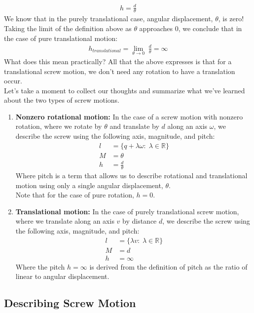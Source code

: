 \documentclass[oneside]{book}
\begin{document}
\begin{align}
    h = \frac{d}{\theta}
\end{align}
We know that in the purely translational case, angular displacement, $\theta$, is zero! Taking the limit of the definition above as $\theta$ approaches $0$, we conclude that in the case of pure translational motion:
\begin{align}
    h_{translational} = \lim_{\theta \to 0} \; \frac{d}{\theta} = \infty
\end{align}
What does this mean practically? All that the above expresses is that for a translational screw motion, we don't need any rotation to have a translation occur.\\
Let's take a moment to collect our thoughts and summarize what we've learned about the two types of screw motions.
\begin{enumerate}
    \item \textbf{Nonzero rotational motion:} In the case of a screw motion with nonzero rotation, where we rotate by $\theta$ and translate by $d$ along an axis $\omega$, we describe the screw using the following axis, magnitude, and pitch:
    \begin{align}
        l &=  \{q + \lambda \omega: \; \lambda \in \mathbb{R}\}\\
        M &= \theta\\
        h &= \frac{d}{\theta}
    \end{align}
    Where pitch is a term that allows us to describe rotational and translational motion using only a single angular displacement, $\theta$.\\
    Note that for the case of pure rotation, $h = 0$.
    \item \textbf{Translational motion:} In the case of purely translational screw motion, where we translate along an axis $v$ by distance $d$, we describe the screw using the following axis, magnitude, and pitch:
    \begin{align}
        l &=  \{\lambda v: \; \lambda \in \mathbb{R}\}\\
        M &= d\\
        h &= \infty
    \end{align}
    Where the pitch $h = \infty$ is derived from the definition of pitch as the ratio of linear to angular displacement.
\end{enumerate}

\subsection{Describing Screw Motion}
\end{document}
